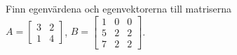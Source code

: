 Finn egenvärdena och egenvektorerna till matriserna\\
$A=\begin{bmatrix}3&2\\1&4\end{bmatrix}$, $B=\begin{bmatrix}1&0&0\\5&2&2\\7&2&2\end{bmatrix}$.